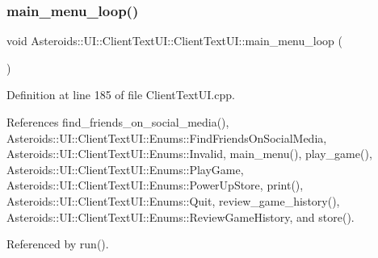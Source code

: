 \subsubsection{\texorpdfstring{main\+\_\+menu\+\_\+loop()}{main\_menu\_loop()}}
{\footnotesize\ttfamily void Asteroids\+::\+U\+I\+::\+Client\+Text\+U\+I\+::\+Client\+Text\+U\+I\+::main\+\_\+menu\+\_\+loop (\begin{DoxyParamCaption}{ }\end{DoxyParamCaption})\hspace{0.3cm}{\ttfamily [private]}}



Definition at line 185 of file Client\+Text\+U\+I.\+cpp.



References find\+\_\+friends\+\_\+on\+\_\+social\+\_\+media(), Asteroids\+::\+U\+I\+::\+Client\+Text\+U\+I\+::\+Enums\+::\+Find\+Friends\+On\+Social\+Media, Asteroids\+::\+U\+I\+::\+Client\+Text\+U\+I\+::\+Enums\+::\+Invalid, main\+\_\+menu(), play\+\_\+game(), Asteroids\+::\+U\+I\+::\+Client\+Text\+U\+I\+::\+Enums\+::\+Play\+Game, Asteroids\+::\+U\+I\+::\+Client\+Text\+U\+I\+::\+Enums\+::\+Power\+Up\+Store, print(), Asteroids\+::\+U\+I\+::\+Client\+Text\+U\+I\+::\+Enums\+::\+Quit, review\+\_\+game\+\_\+history(), Asteroids\+::\+U\+I\+::\+Client\+Text\+U\+I\+::\+Enums\+::\+Review\+Game\+History, and store().



Referenced by run().

